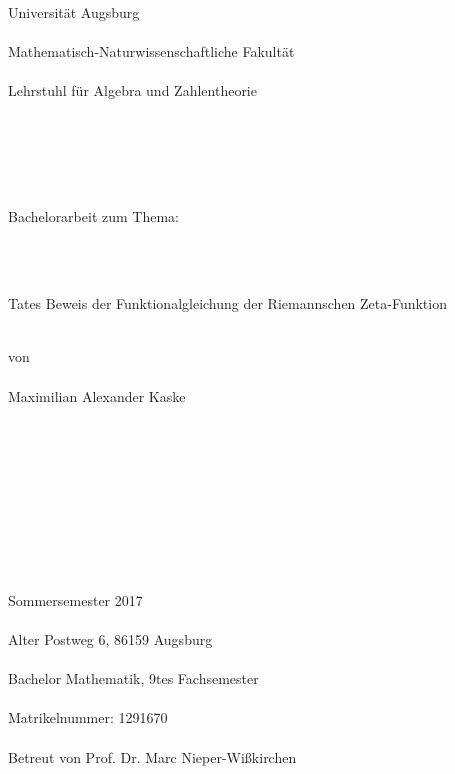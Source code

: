 	
	
	
	\begin{titlepage}

\pagestyle{empty}

\begin{center}
	Universität Augsburg\\
	\ \\
	Mathematisch-Naturwissenschaftliche Fakultät\\
	\ \\
	Lehrstuhl für Algebra und Zahlentheorie \\
\end{center}
\ \\
\ \\
\ \\
\ \\
\begin{center}
	Bachelorarbeit zum Thema:
\end{center}
\ \\
\ \\
\begin{center}
	\begin{LARGE}
		Tates Beweis der Funktionalgleichung der Riemannschen Zeta-Funktion\\
	\end{LARGE}
	\ \\
	von\\
	\ \\
	Maximilian Alexander Kaske
\end{center}
\ \\
\ \\
\ \\
\ \\
\ \\
\ \\
\ \\
\ \\
\begin{small}
	Sommersemester 2017\\
	\ \\
	Alter Postweg 6, 86159 Augsburg\\
	\ \\
	Bachelor Mathematik, 9tes Fachsemester\\
	\ \\
	Matrikelnummer: 1291670  \\
	\ \\
	Betreut von Prof. Dr. Marc Nieper-Wißkirchen
\end{small}
\clearpage
\end{titlepage}